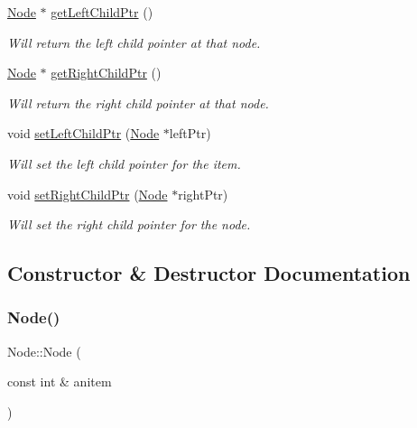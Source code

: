 \begin{DoxyCompactItemize}
\mbox{\hyperlink{class_node}{Node}} $\ast$ \mbox{\hyperlink{class_node_a81c225637a0cc1edd73c2aba18ea6f4a}{get\+Left\+Child\+Ptr}} ()
\begin{DoxyCompactList}\small\item\em Will return the left child pointer at that node. \end{DoxyCompactList}\item 
\mbox{\hyperlink{class_node}{Node}} $\ast$ \mbox{\hyperlink{class_node_a9f9db183586c193a33627e239b1cdab5}{get\+Right\+Child\+Ptr}} ()
\begin{DoxyCompactList}\small\item\em Will return the right child pointer at that node. \end{DoxyCompactList}\item 
void \mbox{\hyperlink{class_node_a4da6acb58d5b8f60bc7ac822250cda32}{set\+Left\+Child\+Ptr}} (\mbox{\hyperlink{class_node}{Node}} $\ast$left\+Ptr)
\begin{DoxyCompactList}\small\item\em Will set the left child pointer for the item. \end{DoxyCompactList}\item 
void \mbox{\hyperlink{class_node_a7e4994f0037bcc6b52a568de0c0a8acf}{set\+Right\+Child\+Ptr}} (\mbox{\hyperlink{class_node}{Node}} $\ast$right\+Ptr)
\begin{DoxyCompactList}\small\item\em Will set the right child pointer for the node. \end{DoxyCompactList}\end{DoxyCompactItemize}


\subsection{Constructor \& Destructor Documentation}
\mbox{\label{class_node_a6b85d29b3bde0f983d0a6135ca440c0a}} 
\subsubsection{\texorpdfstring{Node()}{Node()}\hspace{0.1cm}{\footnotesize\ttfamily [1/2]}}
{\footnotesize\ttfamily Node\+::\+Node (\begin{DoxyParamCaption}\item[{const int \&}]{anitem }\end{DoxyParamCaption})}

